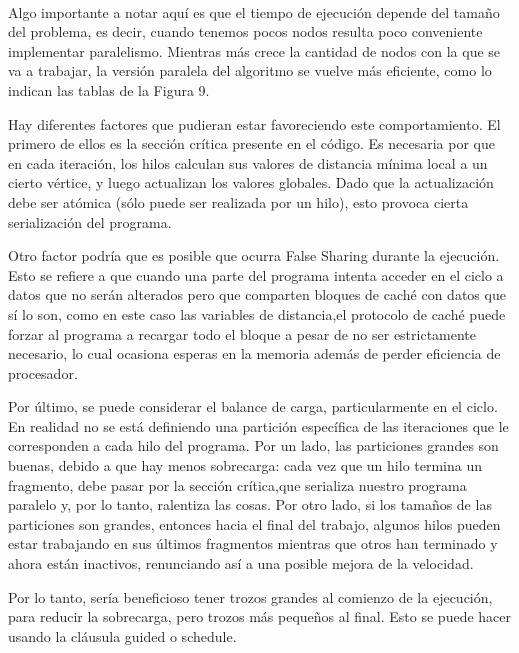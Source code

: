 \documentclass[11pt]{article}
\begin{document}
\paragraph{}
Algo importante a notar aquí es que el tiempo de ejecución depende del tamaño del problema, es decir, cuando tenemos pocos nodos resulta poco conveniente implementar paralelismo. Mientras más crece la cantidad de nodos con la que se va a trabajar, la versión paralela del algoritmo se vuelve más eficiente, como lo indican las tablas de la Figura 9. 
\par 
Hay diferentes factores que pudieran estar favoreciendo este comportamiento. El primero de ellos es la sección crítica presente en el código. Es necesaria por que en cada iteración, los hilos calculan sus valores de distancia mínima local a un cierto vértice, y luego actualizan los valores globales. Dado que la actualización debe ser atómica (sólo puede ser realizada por un hilo), esto provoca cierta serialización del programa.
\par
Otro factor podría que es posible que ocurra False Sharing durante la ejecución. Esto se refiere a que cuando una parte del programa intenta acceder en el ciclo a datos que no serán alterados pero que comparten bloques de caché con datos que sí lo son, como en este caso las variables de distancia,el protocolo de caché puede forzar al programa a recargar todo el bloque a pesar de no ser estrictamente necesario, lo cual ocasiona esperas en la memoria además de perder eficiencia de procesador.

\par
Por último, se puede considerar el balance de carga, particularmente en el ciclo. En realidad no se está definiendo una partición específica de las iteraciones que le corresponden a cada hilo del programa. Por un lado, las particiones grandes son buenas, debido a que hay menos sobrecarga: cada vez que un hilo termina un fragmento, debe pasar por la sección crítica,que serializa nuestro programa paralelo y, por lo tanto, ralentiza las cosas. Por otro lado, si los tamaños de las particiones son grandes, entonces hacia el final del trabajo, algunos hilos pueden estar trabajando en sus últimos fragmentos mientras que otros han terminado y ahora están inactivos, renunciando así a una posible mejora de la velocidad.
\par
Por lo tanto, sería beneficioso tener trozos grandes al comienzo de la ejecución, para reducir la sobrecarga, pero trozos más pequeños al final. 
Esto se puede hacer usando la cláusula guided o schedule.
\end{document}
